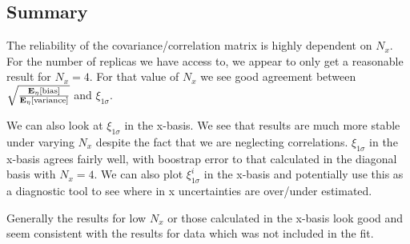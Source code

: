 \subsection{Summary}

The reliability of the covariance/correlation matrix is highly dependent on
$N_x$. For the number of replicas we have access to, we appear to only get a
reasonable result for $N_x=4$. For that value of $N_x$ we see good agreement
between $\sqrt{\frac{\mathbf{E}_{\eta}\left[ {\rm bias} \right]}{\mathbf{E}_{\eta}\left[ {\rm variance} \right]}}$ and $\xi_{1\sigma}$.

We can also look at $\xi_{1\sigma}$ in the x-basis. We see that results are
much more stable under varying $N_x$ despite the fact that we are neglecting
correlations. $\xi_{1\sigma}$ in the x-basis agrees fairly well, with boostrap
error to that calculated in the diagonal basis with $N_x=4$. We can also
plot $\xi_{1\sigma}^i$ in the x-basis and potentially use this as a diagnostic
tool to see where in x uncertainties are over/under estimated.

Generally the results for low $N_x$ or those calculated in the x-basis look good
and seem consistent with the results for data which was not included in the fit.
